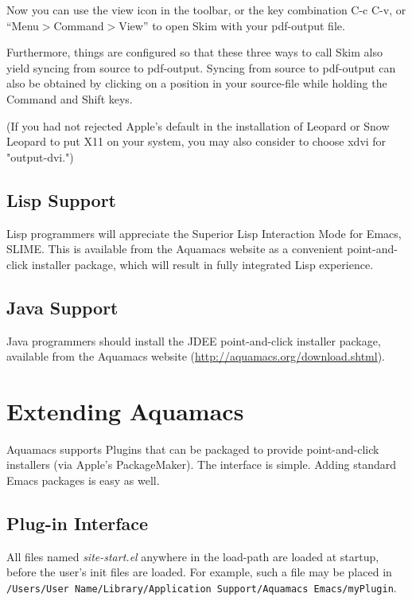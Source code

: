 \documentclass[11pt,letterpaper]{article}
\newcommand{\ttfile}{\tt}
\begin{document}
Now you can use the view icon in the toolbar, or the key combination
C-c C-v, or ``Menu$>$Command$>$View'' to open Skim with your pdf-output file. 

Furthermore, things are configured so that these three ways to call
Skim also yield syncing from source to pdf-output. Syncing from source
to pdf-output can also be obtained by clicking on a position in
your source-file while holding the Command and Shift keys.

(If you had not rejected Apple's default in the installation of Leopard or Snow Leopard to put X11 on your system, you may also consider to choose xdvi for "output-dvi.")




\subsection{Lisp Support}

Lisp programmers will appreciate the Superior Lisp Interaction Mode for Emacs, SLIME.  This is available from the Aquamacs website as a convenient point-and-click installer package, which will result in fully integrated Lisp experience.


\subsection{Java Support}

Java programmers should install the JDEE point-and-click installer package, available from the Aquamacs website (\url{http://aquamacs.org/download.shtml}).

\section{Extending Aquamacs}

Aquamacs supports Plugins that can be packaged to provide point-and-click installers (via Apple's 
PackageMaker). The interface is simple.
Adding standard Emacs packages is easy as well.

\subsection{Plug-in Interface}

All files named \emph{site-start.el} anywhere in the load-path are loaded at startup, before the user's init files are loaded. For example, such a file may be placed in \\  {\ttfile /Users/User Name/Library/Application Support/Aquamacs Emacs/myPlugin}. 
\end{document}
